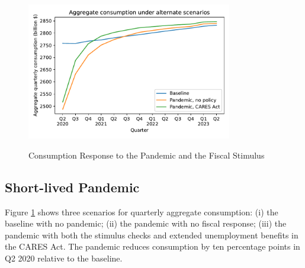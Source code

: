 \begin{figure}
	\centering
	\caption{Consumption Response to the Pandemic and the Fiscal Stimulus}
	\label{cons_response}
	{ \includegraphics[width=0.8\textwidth]{./Figures/AggConResp_examples}}
\end{figure}

\subsection{Short-lived Pandemic}

Figure \ref{cons_response} shows three scenarios for quarterly aggregate consumption: (i) the baseline with no pandemic; (ii) the pandemic with no fiscal response; (iii) the pandemic with both the stimulus checks and extended unemployment benefits in the CARES Act.
The pandemic reduces consumption by ten percentage points in Q2 2020 relative to the baseline.

